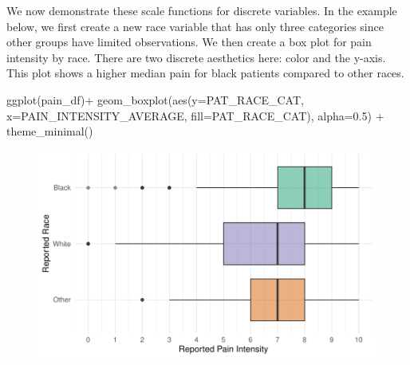 \documentclass[
  letterpaper,
]{krantz}
\makeatletter
\newenvironment{Shaded}{\begin{snugshade}}{\end{snugshade}}
\newcommand{\AttributeTok}[1]{\textcolor[rgb]{0.40,0.45,0.13}{#1}}
\newcommand{\FloatTok}[1]{\textcolor[rgb]{0.68,0.00,0.00}{#1}}
\newcommand{\FunctionTok}[1]{\textcolor[rgb]{0.28,0.35,0.67}{#1}}
\newcommand{\NormalTok}[1]{\textcolor[rgb]{0.00,0.23,0.31}{#1}}
\newcommand{\OtherTok}[1]{\textcolor[rgb]{0.00,0.23,0.31}{#1}}
\newcommand{\SpecialCharTok}[1]{\textcolor[rgb]{0.37,0.37,0.37}{#1}}
\newcommand{\StringTok}[1]{\textcolor[rgb]{0.13,0.47,0.30}{#1}}
\newenvironment{kframe}{%
\medskip{}
\setlength{\fboxsep}{.8em}
 \def\at@end@of@kframe{}%
 \ifinner\ifhmode%
  \def\at@end@of@kframe{\end{minipage}}%
  \begin{minipage}{\columnwidth}%
 \fi\fi%
 \def\FrameCommand##1{\hskip\@totalleftmargin \hskip-\fboxsep
 \colorbox{shadecolor}{##1}\hskip-\fboxsep
     \hskip-\linewidth \hskip-\@totalleftmargin \hskip\columnwidth}%
 \MakeFramed {\advance\hsize-\width
   \@totalleftmargin\z@ \linewidth\hsize
   \@setminipage}}%
 {\par\unskip\endMakeFramed%
 \at@end@of@kframe}
\renewenvironment{Shaded}{\begin{kframe}}{\end{kframe}}
\makeatother
\begin{document}
We now demonstrate these scale functions for discrete variables. In the
example below, we first create a new race variable that has only three
categories since other groups have limited observations. We then create
a box plot for pain intensity by race. There are two discrete aesthetics
here: color and the y-axis. This plot shows a higher median pain for
black patients compared to other races.

\begin{Shaded}
\end{Shaded}

\begin{Shaded}
\begin{Highlighting}[]
\FunctionTok{ggplot}\NormalTok{(pain\_df)}\SpecialCharTok{+}
  \FunctionTok{geom\_boxplot}\NormalTok{(}\FunctionTok{aes}\NormalTok{(}\AttributeTok{y=}\NormalTok{PAT\_RACE\_CAT, }\AttributeTok{x=}\NormalTok{PAIN\_INTENSITY\_AVERAGE, }
                   \AttributeTok{fill=}\NormalTok{PAT\_RACE\_CAT), }\AttributeTok{alpha=}\FloatTok{0.5}\NormalTok{) }\SpecialCharTok{+}
  \FunctionTok{theme\_minimal}\NormalTok{()}
\end{Highlighting}
\end{Shaded}

\begin{figure}[H]

{\centering \includegraphics[width=1\textwidth,height=\textheight]{book/7_visualization_ggplot_files/figure-pdf/unnamed-chunk-12-1.pdf}

}

\end{figure}
\end{document}
